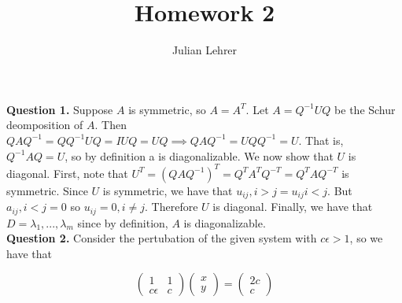 \documentclass{article}
\title{Homework 2}
\date{}
\author{Julian Lehrer}
\begin{document}
\maketitle
\textbf{Question 1.} Suppose $A$ is symmetric, so $A=A^{T}$. Let $A=Q^{-1}UQ$ be the Schur deomposition of $A$. Then $QAQ^{-1}=QQ^{-1}UQ = IUQ = UQ \implies QAQ^{-1}=UQQ^{-1}=U$. That is, $Q^{-1}AQ = U$, so by definition a is diagonalizable. We now show that $U$ is diagonal. First, note that $U^T = (QAQ^{-1})^T = Q^TA^TQ^{-T} = Q^T A Q^{-T}$ is symmetric. Since $U$ is symmetric, we have that $u_{ij}, i > j = u_{ij} i < j$. But $a_{ij}, i < j = 0$ so $u_{ij} = 0, i \neq j$. Therefore $U$ is diagonal. Finally, we have that $D={\lambda_1,...,\lambda_m}$ since by definition, $A$ is diagonalizable. \\

\textbf{Question 2.} Consider the pertubation of the given system with $c\epsilon > 1$, so we have that 

\begin{equation*}
    \begin{pmatrix}
        1&1\\
        c\epsilon&c
    \end{pmatrix}\begin{pmatrix}
        x\\y
    \end{pmatrix}=
    \begin{pmatrix}
        2c\\c
    \end{pmatrix}
\end{equation*}
\end{document}
